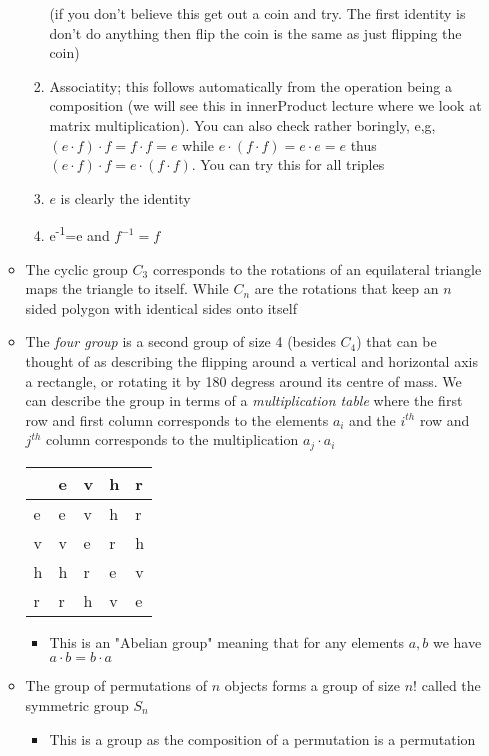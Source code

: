 \documentclass[11pt]{article}
\begin{document}
\begin{itemize}
\begin{itemize}
\begin{enumerate}
(if you don't believe this get out a coin and try.  The first identity is don't do anything
then flip the coin is the same as just flipping the coin)
\item Associatity; this follows automatically from the operation being a composition
(we will see this in innerProduct lecture where we look at matrix multiplication).
You can also check rather boringly, e,g, \((e\cdot f)\cdot f =f\cdot f = e\) while
\(e\cdot(f\cdot f) = e \cdot e = e\) thus \((e\cdot f)\cdot f =e\cdot(f\cdot f)\).  You can
try this for all triples
\item \(e\) is clearly the identity
\item e\textsuperscript{-1}=e and \(f^{-1}=f\)
\end{enumerate}
\item The cyclic group \(C_{3}\) corresponds to the rotations of an equilateral triangle maps
the triangle to itself.  While \(C_{n}\) are the rotations that keep an \(n\) sided polygon
with identical sides onto itself
\item The \emph{four group} is a second group of size 4 (besides \(C_{4}\)) that can be thought of
as describing the flipping around a vertical and horizontal axis a rectangle, or rotating
it by 180 degress around its centre of mass.  We can describe the group in terms of
a \emph{multiplication table} where the first row and first column corresponds to the elements
\(a_{i}\) and the \(i^{th}\) row and \(j^{th}\) column corresponds to
the multiplication \(a_{j}\cdot a_{i}\)
\begin{center}
\begin{tabular}{l|llll}
\hline
 & e & v & h & r\\
\hline
e & e & v & h & r\\
v & v & e & r & h\\
h & h & r & e & v\\
r & r & h & v & e\\
\hline
\end{tabular}
\end{center}
\begin{itemize}
\item This is an "Abelian group" meaning that for any elements \(a, b\) we have \(a\cdot b = b\cdot a\)
\end{itemize}
\item The group of permutations of \(n\) objects forms a group of size \(n!\) called the
symmetric group \(S_{n}\)
\begin{itemize}
\item This is a group as the composition of a permutation is a permutation

\end{itemize}
\end{itemize}
\end{itemize}
\end{document}
